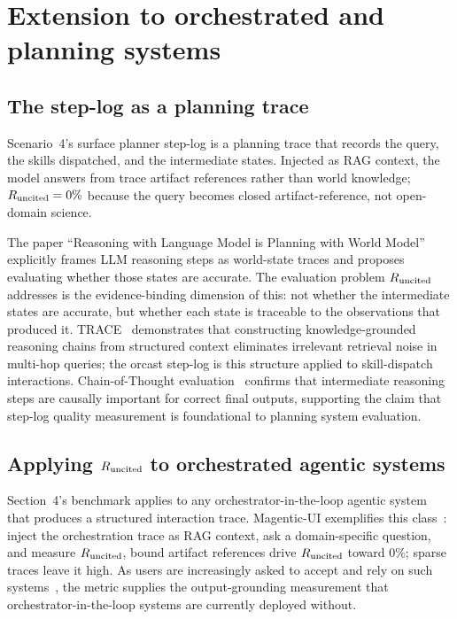 \section{Extension to orchestrated and planning systems}

\subsection{The step-log as a planning trace}

Scenario~4's surface planner step-log is a planning trace that records the query, the skills
dispatched, and the intermediate states. Injected as RAG context, the model answers from trace
artifact references rather than world knowledge; $R_{\mathrm{uncited}} = 0\%$ because the query becomes closed
artifact-reference, not open-domain science.

The paper ``Reasoning with Language Model is Planning with World Model''~\cite{arxiv230514992}
explicitly frames LLM reasoning steps as world-state traces and proposes evaluating whether
those states are accurate. The evaluation problem $R_{\mathrm{uncited}}$ addresses is the evidence-binding
dimension of this: not whether the intermediate states are accurate, but whether each state
is traceable to the observations that produced it. TRACE~\cite{arxiv240611460} demonstrates
that constructing knowledge-grounded reasoning chains from structured context eliminates
irrelevant retrieval noise in multi-hop queries; the orcast step-log is this structure applied
to skill-dispatch interactions. Chain-of-Thought evaluation~\cite{arxiv220111903} confirms
that intermediate reasoning steps are causally important for correct final outputs, supporting
the claim that step-log quality measurement is foundational to planning system evaluation.

\subsection{Applying $R_{\mathrm{uncited}}$ to orchestrated agentic systems}

Section~4's benchmark applies to any orchestrator-in-the-loop agentic system that produces a
structured interaction trace. Magentic-UI exemplifies this class~\cite{magenticui2025}: inject the
orchestration trace as RAG context, ask a domain-specific question, and measure $R_{\mathrm{uncited}}$, bound
artifact references drive $R_{\mathrm{uncited}}$ toward 0\%; sparse traces leave it high. As users are increasingly asked to
accept and rely on such systems~\cite{koenig2025acceptance}, the metric supplies the output-grounding
measurement that orchestrator-in-the-loop systems are currently deployed without.

